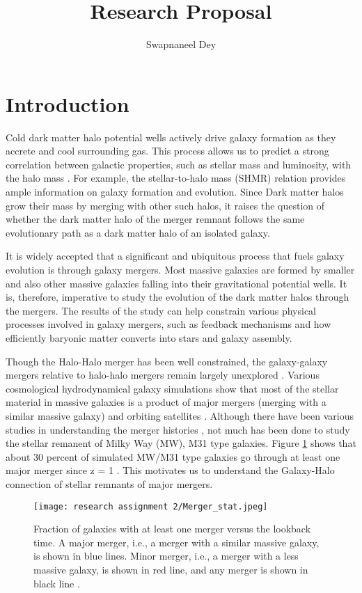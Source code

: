 \documentclass[twocolumn]{aastex631}
\begin{document}
\title{Research Proposal}

\author{Swapnaneel Dey}


\section{Introduction}
Cold dark matter halo potential wells actively drive galaxy formation as they accrete and cool surrounding gas. This process allows us to predict a strong correlation between galactic properties, such as stellar mass and luminosity, with the halo mass \citep{Girelli+2020}. For example, the stellar-to-halo mass (SHMR) relation provides ample information on galaxy formation and evolution. Since Dark matter halos grow their mass by merging with other such halos, it raises the question of whether the dark matter halo of the merger remnant follows the same evolutionary path as a dark matter halo of an isolated galaxy.

It is widely accepted that a significant and ubiquitous process that fuels galaxy evolution is through galaxy mergers. Most massive galaxies are formed by smaller and also other massive galaxies falling into their gravitational potential wells. It is, therefore, imperative to study the evolution of the dark matter halos through the mergers. The results of the study can help constrain various physical processes involved in galaxy mergers, such as feedback mechanisms and how efficiently baryonic matter converts into stars and galaxy assembly. 

Though the Halo-Halo merger has been well constrained, the galaxy-galaxy mergers relative to halo-halo mergers remain largely unexplored \citep{Hopkins+2010}. Various cosmological hydrodynamical galaxy simulations show that most of the stellar material in massive galaxies is a product of major mergers (merging with a similar massive galaxy) and orbiting satellites \citep{RG+2016}. Although there have been various studies in understanding the merger histories \citep{Hao+2022, Ramos+2022}, not much has been done to study the stellar remanent of Milky Way (MW), M31 type galaxies. Figure \ref{fig:merger statistics} shows that about 30 percent of simulated MW/M31 type galaxies go through at least one major merger since z = 1 \citep{Ramos+2022}. This motivates us to understand the Galaxy-Halo connection of stellar remnants of major mergers.
\begin{figure}[h!]
    \centering
    \texttt{[image: research assignment 2/Merger\_stat.jpeg]}
    \caption{Fraction of galaxies with at least one merger versus the lookback time. A major merger, i.e., a merger with a similar massive galaxy, is shown in blue lines. Minor merger, i.e., a merger with a less massive galaxy, is shown in red line, and any merger is shown in black line \citep{Ramos+2022}.}
    \label{fig:merger statistics}
\end{figure}
\end{document}
